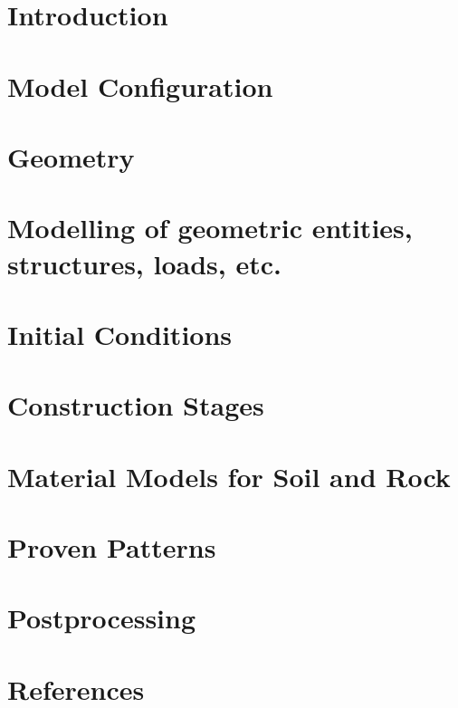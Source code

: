 \documentclass[12pt,a4paper]{report}
\title{\varTitle}
\author{\varAuthor}
\date{\varDate}
\begin{document}



\tableofcontents

\chapter{Introduction}
\label{chap:introduction}


\chapter{Model Configuration}
\label{chap:setup}


\chapter{Geometry}
\label{chap:geometry}


\chapter{Modelling of geometric entities, structures, loads, etc.}
\label{chap:entities}


\chapter{Initial Conditions}
\label{chap:initial}


\chapter{Construction Stages}
\label{chap:stages}


\chapter{Material Models for Soil and Rock}
\label{chap:materials}


\chapter{Proven Patterns}
\label{chap:patterns}


\chapter{Postprocessing}
\label{chap:postprocessing}


\chapter{References}
\label{chap:references}


% 
\end{document}
